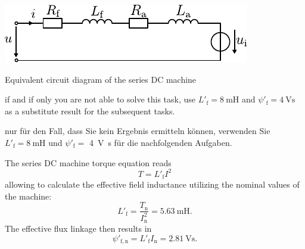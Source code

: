 \begin{solutionblock}
\begin{solutionfigure}[ht]
    \centering
    \includegraphics[width=0.6\linewidth]{fig/ECD_DC_series.pdf}
    \caption{Equivalent circuit diagram of the series DC machine}
    \label{fig:ECD_DC_series}
\end{solutionfigure}
\end{solutionblock}

%
\begin{hintblock}
if and if only you are not able to solve this task, use $L'_\mathrm{f} = \SI{8}{\milli\henry}$ and $\psi'_\mathrm{f} = \SI{4}{\volt\second}$ as a substitute result for the subsequent tasks.
\end{hintblock}

%
\begin{germanhintblock}
nur für den Fall, dass Sie kein Ergebnis ermitteln können, verwenden Sie $L'_\mathrm{f} = \SI{8}{\milli\henry}$ und $\psi'_\mathrm{f} =$ \SI{4}{\volt\second} für die nachfolgenden Aufgaben.
\end{germanhintblock}


\begin{solutionblock}
    The series DC machine torque equation reads
    $$
    T = L'_\mathrm{f} I^2
    $$
    allowing to calculate the effective field inductance utilizing the nominal values of the machine:
    $$
    L'_\mathrm{f} = \frac{T_\mathrm{n}}{I^2_\mathrm{n}} = \SI{5.63}{\milli\henry}.
    $$
    The effective flux linkage then results in
    $$
    \psi'_\mathrm{f,n} = L'_\mathrm{f}I_\mathrm{n}=\SI{2.81}{\volt\second}.
    $$
\end{solutionblock}




